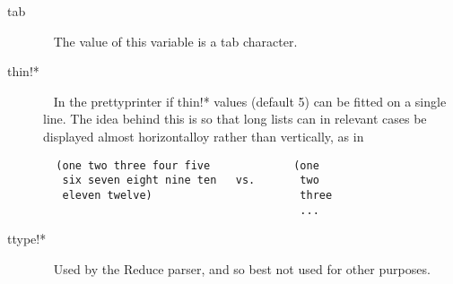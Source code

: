 \documentclass[a4paper,11pt]{article}
\begin{document}
\begin{description}
\item [{\ttfamily tab}]  ~\newline
The value of this variable is a tab character.

\item [{\ttfamily thin!*}]  ~\newline
In the prettyprinter if {\ttfamily thin!*} values (default 5) can be
fitted on a single line. The idea behind this is so that long lists can
in relevant cases be displayed almost horizontalloy rather than
vertically, as in
{\footnotesize\begin{verbatim}
  (one two three four five             (one
   six seven eight nine ten   vs.       two
   eleven twelve)                       three
                                        ...
\end{verbatim}}

\item [{\ttfamily ttype!*}]  ~\newline
Used by the Reduce parser, and so best not used for other purposes.

\end{description} %

\end{document}
